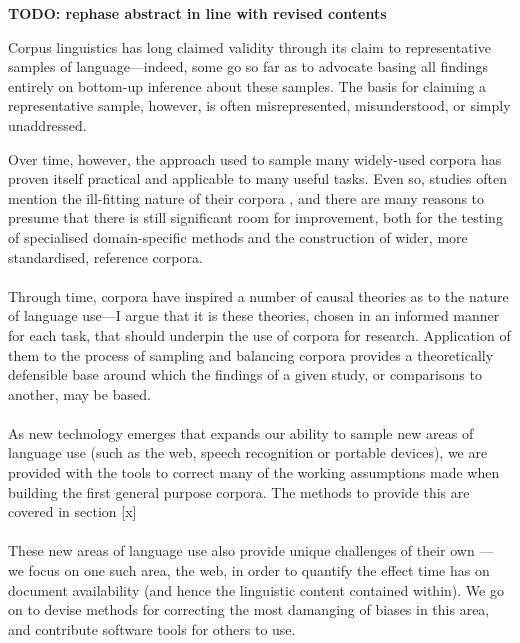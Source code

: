 



{\bf TODO: rephase abstract in line with revised contents}


Corpus linguistics has long claimed validity through its claim to representative samples of language---indeed, some go so far as to advocate basing all findings entirely on bottom-up inference about these samples.  The basis for claiming a representative sample, however, is often misrepresented, misunderstood, or simply unaddressed.

Over time, however, the approach used to sample many widely-used corpora has proven itself practical and applicable to many useful tasks.  Even so, studies often mention the ill-fitting nature of their corpora%
, and there are many reasons to presume that there is still significant room for improvement, both for the testing of specialised domain-specific methods and the construction of wider, more standardised, reference corpora.

\paragraph{}
Through time, corpora have inspired a number of causal theories as to the nature of language use---I argue that it is these theories, chosen in an informed manner for each task, that should underpin the use of corpora for research.  Application of them to the process of sampling and balancing corpora provides a theoretically defensible base around which the findings of a given study, or comparisons to another, may be based.

\paragraph{}
As new technology emerges that expands our ability to sample new areas of language use (such as the web, speech recognition or portable devices), we are provided with the tools to correct many of the working assumptions made when building the first general purpose corpora.  The methods to provide this are covered in section [x]

\paragraph{}
These new areas of language use also provide unique challenges of their own --- we focus on one such area, the web, in order to quantify the effect time has on document availability (and hence the linguistic content contained within).  We go on to devise methods for correcting the most damanging of biases in this area, and contribute software tools for others to use.

